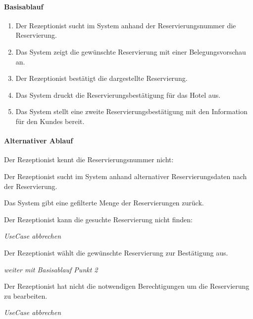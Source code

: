 \paragraph{Basisablauf}
\begin{enumerate}
	\item Der \Gls{Rezeptionist} sucht im System anhand der \Gls{Reservierungsnummer} die \Gls{Reservierung}.
	\item Das System zeigt die gewünschte \Gls{Reservierung} mit einer \Gls{Belegungsvorschau} an.
	\item Der \Gls{Rezeptionist} bestätigt die dargestellte \Gls{Reservierung}.
	\item Das System druckt die Reservierungsbestätigung für das Hotel aus.
	\item Das System stellt eine zweite Reservierungsbestätigung mit den Information für den \Glspl{Kunde} bereit.
\end{enumerate}

\paragraph{Alternativer Ablauf}
\begin{longenum}
	\item
	\begin{longenum}
		\item Der Rezeptionist kennt die \Gls{Reservierungsnummer} nicht:
		\begin{longenum}
			\item Der \Gls{Rezeptionist} sucht im System anhand alternativer Reservierungsdaten nach der \Gls{Reservierung}.
			\item Das System gibt eine gefilterte Menge der \Gls{Reservierung}en zurück.
			\begin{longenum}
				\item Der \Gls{Rezeptionist} kann die gesuchte \Gls{Reservierung} nicht finden:
				\begin{longenum}
					\item \emph{UseCase abbrechen}
				\end{longenum}
			\end{longenum}
			\item Der \Gls{Rezeptionist} wählt die gewünschte \Gls{Reservierung} zur Bestätigung aus.
			\item \emph{weiter mit Basisablauf Punkt 2}
		\end{longenum}
	\end{longenum}
	\item
	\item
	\begin{longenum}
		\item Der \Gls{Rezeptionist} hat nicht die notwendigen Berechtigungen um die \Gls{Reservierung} zu bearbeiten.
		\begin{longenum}
			\item \emph{UseCase abbrechen}
		\end{longenum}
	\end{longenum}
	\item
	\item
\end{longenum}

